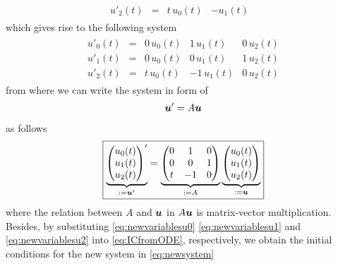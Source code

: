 \documentclass[12pt]{article}
\begin{document}
\begin{enumerate}[i)]
\begin{align}
\begin{array}{ccccc}
			      u'_{2}(t) & = & t\,u_{0}(t) & -u_{1}(t) & 
		      \end{array}
	      \end{align}
	      which gives rise to the following system 
	      \begin{align}
		      \begin{array}{ccccc}
			      u'_{0}(t) & = & 0\,u_{0}(t) & 1\,u_{1}(t)  & 0\,u_{2}(t) \\
			      u'_{1}(t) & = & 0\,u_{0}(t) & 0\,u_{1}(t)  & 1\,u_{2}(t) \\
			      u'_{2}(t) & = & t\,u_{0}(t) & -1\,u_{1}(t) & 0\,u_{2}(t)
		      \end{array}
	      \end{align}
	      from where we can write the system in form of 
	      \begin{align}
		      {\boldsymbol{\mathnormal u}}' = A{\boldsymbol{\mathnormal u}}	
	      \end{align}
	      as follows
	      \begin{align}
		      \label{eq:newsystem}
		      \boxed{
			      \begin{aligned}
				      \underbrace{
				      \begin{pmatrix} u_{0}(t)\\u_{1}(t)\\u_{2}(t) \end{pmatrix}^{\prime}
				      }_{:={\boldsymbol{\mathnormal u}}^{\prime}}
				      =
				      \underbrace{
					      \begin{pmatrix}
						      0 & 1 & 0 \\ 0 & 0 & 1 \\ t & -1 & 0
					      \end{pmatrix}
				      }_{:=A}
				      \underbrace{
					      \begin{pmatrix} u_{0}(t)\\u_{1}(t)\\u_{2}(t) \end{pmatrix}
				      }_{:={\boldsymbol{\mathnormal u}}}
			      \end{aligned}
		      }
	      \end{align}
	      where the relation between $A$ and ${\boldsymbol{\mathnormal u}}$ in $A{\boldsymbol{\mathnormal u}}$
	      is matrix-vector multiplication. Besides,
	      by substituting 
	      \eqref{eq:newvariablesu0}
	      \eqref{eq:newvariablesu1}
	      and 
	      \eqref{eq:newvariablesu2}
	      into 
	      \eqref{eq:ICfromODE}, respectively,
	      we obtain the initial conditions 
	      for the new system in 
	      \eqref{eq:newsystem}
	      \begin{align}

\end{align}
\end{enumerate}
\end{document}
